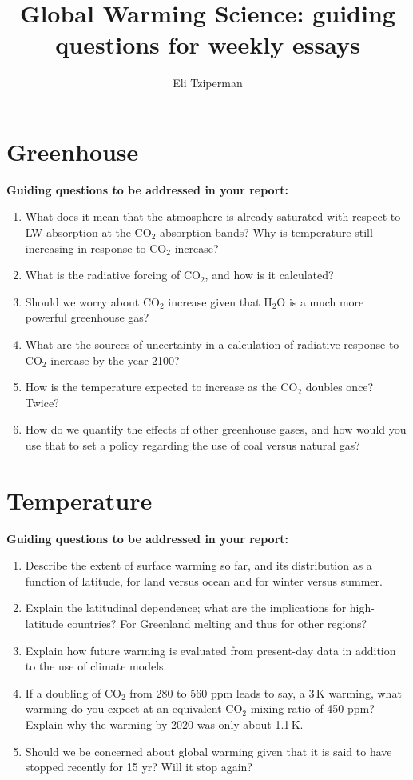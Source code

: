 \documentclass[12pt]{article}
\begin{document}
\title{Global Warming Science: guiding questions for weekly essays}\author{Eli Tziperman}\date{}\maketitle
\section*{Greenhouse}
  \textbf{Guiding questions to be addressed in your report:}
    \begin{enumerate}
    \item What does it mean that the atmosphere is already saturated with respect to LW absorption at the CO$_2$ absorption bands? Why is temperature still increasing in response to CO$_2$ increase?
    \item What is the radiative forcing of CO$_2$, and how is it calculated?
    \item Should we worry about CO$_2$ increase given that H$_2$O is a much more powerful greenhouse gas?
    \item What are the sources of uncertainty in a calculation of radiative response to CO$_2$ increase by the year 2100?
    \item How is the temperature expected to increase as the CO$_2$ doubles once? Twice?
    \item How do we quantify the effects of other greenhouse gases, and how would you use that to set a policy regarding the use of coal versus natural gas?
    \end{enumerate}

\section*{Temperature}
  \textbf{Guiding questions to be addressed in your report:}
    \begin{enumerate}
    \item Describe the extent of surface warming so far, and its distribution as a function of latitude, for land versus ocean and for winter versus summer.
    \item Explain the latitudinal dependence; what are the implications for high-latitude countries? For Greenland melting and thus for other regions?
    \item Explain how future warming is evaluated from present-day data in addition to the use of climate models.
    \item If a doubling of CO$_2$ from 280 to 560 ppm leads to say, a 3\,K warming, what warming do you expect at an equivalent CO$_2$ mixing ratio of 450 ppm? Explain why the warming by 2020 was only about 1.1\,K.
    \item Should we be concerned about global warming given that it is said to have stopped recently for 15 yr? Will it stop again?
    \end{enumerate}
\end{document}
